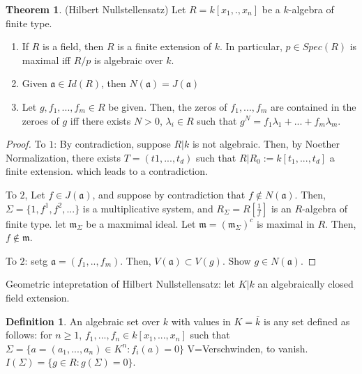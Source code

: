 \documentclass{article}
\theoremstyle{definition}
\newtheorem{theorem}{Theorem}[section]
\theoremstyle{definition}
\theoremstyle{definition}
\theoremstyle{definition}
\theoremstyle{definition}
\newtheorem{definition}{Definition}[section]
\theoremstyle{definition}
\theoremstyle{definition}
\begin{document}
\begin{tcolorbox}[colback=red!5!white,colframe=red!30!white]
\begin{theorem}
(Hilbert Nullstellensatz) Let $R=k[x_1,.,x_n]$ be a $k$-algebra of finite type. 
\begin{enumerate}
    \item If $R$ is a field, then $R$ is a finite extension of $k$. In particular, $p\in Spec(R)$ is maximal iff $R/p$ is algebraic over $k$. 
    \item Given $\mathfrak{a}\in Id(R)$, then $N(\mathfrak{a})=J(\mathfrak{a})$
    \item Let $g, f_1,...,f_m\in R$ be given. Then, the zeros of $f_1,...,f_m$ are contained in the zeroes of $g$ iff there exists $N>0$, $\lambda_i\in R$ such that $g^N=f_1\lambda_1+...+f_m\lambda_m$. 
\end{enumerate}
\end{theorem}
\end{tcolorbox}
\begin{proof}
    To $1$: By contradiction, suppose $R|k$ is not algebraic. Then, by Noether Normalization, there exists $T=(t1,...,t_d)$ such that $R|R_0:=k[t_1,...,t_d]$ a finite extension. which leads to a contradiction. 

    To $2$, Let $f\in J(\mathfrak{a})$, and suppose by contradiction that $f\not\in N(\mathfrak{a})$. Then, $\Sigma=\{1,f^1,f^2,...\}$ is a multiplicative system, and $R_{\Sigma}=R[\frac{1}{f}]$ is an $R$-algebra of finite type. let $\mathfrak{m}_{\Sigma}$ be a maxmimal ideal. Let $\mathfrak{m}=(\mathfrak{m}_{\Sigma})^{c}$ is maximal in $R$. Then, $f\not \in \mathfrak{m}$. 

    To $2$: setg $\mathfrak{a}=(f_1,..,f_m)$. Then, $V(\mathfrak{a})\subset V(g)$. Show $g\in N(\mathfrak{a})$. 
\end{proof}

Geometric intepretation of Hilbert Nullstellensatz: let $K|k$ an algebraically closed field extension. 


\begin{tcolorbox}[colback=purple!5!white,colframe=purple!75!black]
\begin{definition}
An algebraic set over $k$ with values in $K=\overline{k}$ is any set defined as follows: for $n\geq 1$, $f_1,...,f_n\in k[x_1,...,x_n]$ such that $\Sigma=\{ a=(a_1,...,a_n)\in K^n: f_i(a)=0 \}$ V=Verschwinden, to vanish. $I(\Sigma)=\{ g\in R: g(\Sigma)=0 \}$. 
\end{definition}
\end{tcolorbox}
\end{document}
